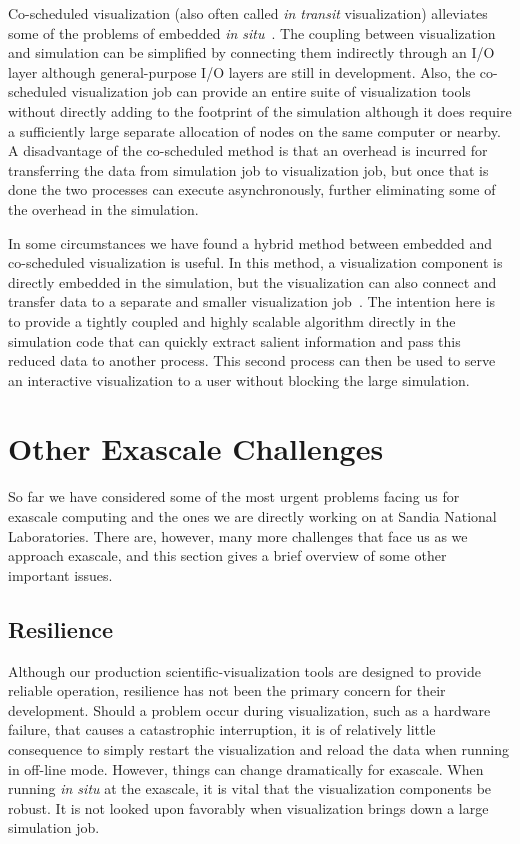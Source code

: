 \documentclass[conference]{IEEEtran}
\newcommand*{\lcite}[1]{~\cite{#1}}
\newcommand{\insitu}{{\it in situ}\xspace}
\newcommand{\intransit}{{\it in transit}\xspace}
\begin{document}
Co-scheduled visualization (also often called \intransit visualization)
alleviates some of the problems of embedded
\insitu\lcite{Moreland2011:PDAC,Biddiscombe2012,Klasky2011}.  The coupling
between visualization and simulation can be simplified by connecting them
indirectly through an I/O layer although general-purpose I/O layers are
still in development.  Also, the co-scheduled visualization job can provide
an entire suite of visualization tools without directly adding to the
footprint of the simulation although it does require a sufficiently large
separate allocation of nodes on the same computer or nearby.  A
disadvantage of the co-scheduled method is that an overhead is incurred for
transferring the data from simulation job to visualization job, but once
that is done the two processes can execute asynchronously, further
eliminating some of the overhead in the simulation.

In some circumstances we have found a hybrid method between embedded and
co-scheduled visualization is useful.  In this method, a visualization
component is directly embedded in the simulation, but the visualization can
also connect and transfer data to a separate and smaller visualization
job\lcite{Moreland2011:PDAC}.  The intention here is to provide a tightly
coupled and highly scalable algorithm directly in the simulation code that
can quickly extract salient information and pass this reduced data to
another process.  This second process can then be used to serve an
interactive visualization to a user without blocking the large simulation.

\section{Other Exascale Challenges}
\label{sec:Other}

\noindent
So far we have considered some of the most urgent problems facing us for
exascale computing and the ones we are directly working on at Sandia
National Laboratories.  There are, however, many more challenges that face
us as we approach exascale, and this section gives a brief overview of some
other important issues.

\subsection{Resilience}

\noindent
Although our production scientific-visualization tools are designed to
provide reliable operation, resilience has not been the primary concern for
their development.  Should a problem occur during visualization, such as a
hardware failure, that causes a catastrophic interruption, it is of
relatively little consequence to simply restart the visualization and
reload the data when running in off-line mode.  However, things can change
dramatically for exascale.  When running \insitu at the exascale, it is
vital that the visualization components be robust.  It is not looked upon
favorably when visualization brings down a large simulation job.
\end{document}
